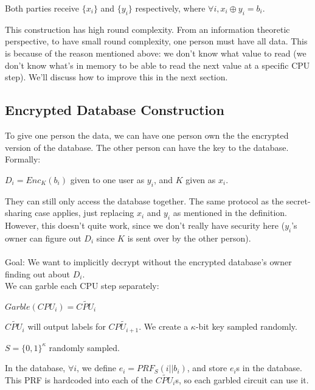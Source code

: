 Both parties receive $\{x_{i}\}$ and $\{y_{i}\}$ respectively, where $\forall i, x_{i} \oplus y_{i} = b_{i}$. 


This construction has high round complexity. From an information theoretic perspective, to have small round complexity, one person must have all data. This is because of the reason mentioned above: we don't know what value to read (we don't know what's in memory to be able to read the next value at a specific CPU step). We'll discuss how to improve this in the next section.

\subsection{Encrypted Database Construction}
To give one person the data, we can have one person own the the encrypted version of the database. The other person can have the key to the database. Formally:
\begin{definition}
$D_{i} = Enc_{K}(b_{i})$ given to one user as $y_{i} $, and $K$ given as $x_{i}$.
\end{definition}
They can still only access the database together. The same protocol as the secret-sharing case applies, just replacing $x_{i}$ and $y_{i}$ as mentioned in the definition. However, this doesn't quite work, since we don't really have security here ($y_{i}$'s owner can figure out $D_{i}$ since $K$ is sent over by the other person).\\ \\
Goal: We want to implicitly decrypt without the encrypted database's owner finding out about $D_{i}$.\\
We can garble each CPU step separately:
\begin{definition}
$Garble(CPU_{i}) = \widetilde{CPU_{i}}$
\end{definition}
$\widetilde{CPU_{i}}$ will output labels for $\widetilde{CPU_{i+1}}$. We create a $\kappa$-bit key sampled randomly.
\begin{definition}
$S = \{0,1\}^{\kappa}$ randomly sampled.
\end{definition}

In the database, $\forall i$, we define $e_{i} = PRF_{S}(i || b_{i})$, and store $e_{i}$s in the database. This PRF is hardcoded into each of the $\widetilde{CPU_{i}}$s, so each garbled circuit can use it.\\

